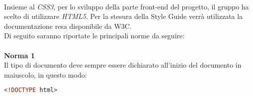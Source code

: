\label{html}\-\\

Insieme al \textit{CSS3}, per lo sviluppo della parte front-end del progetto, il gruppo ha scelto di utilizzare \textit{HTML5}. Per la stesura della Style Guide verrà utilizzata la documentazione resa disponibile da W3C.\\
Di seguito saranno riportate le principali norme da seguire: \\
\-\\
\textbf{Norma 1}\\
Il tipo di documento deve sempre essere dichiarato all'inizio del documento in maiuscolo, in questo modo:\\
	\begin{lstlisting}[language=HTML]
<!DOCTYPE html>
	\end{lstlisting}

